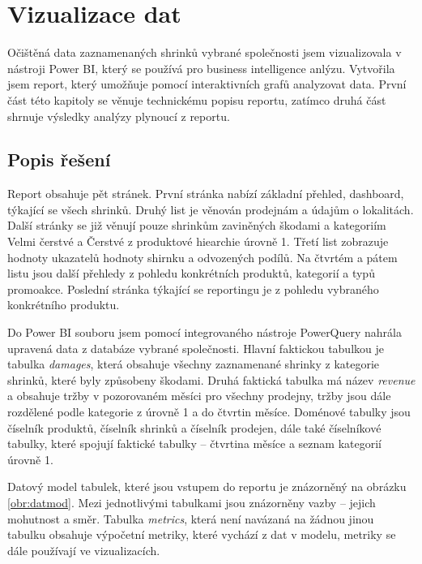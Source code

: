 \chapter{Vizualizace dat}
\label{ch:vizualizace}

Očištěná data zaznamenaných shrinků vybrané společnosti jsem vizualizovala v nástroji Power BI, který se používá pro business intelligence anlýzu. Vytvořila jsem report, který umožňuje pomocí interaktivních grafů analyzovat data. První část této kapitoly se věnuje technickému popisu reportu, zatímco druhá část shrnuje výsledky analýzy plynoucí z reportu.

\section{Popis řešení}
\label{sec:vizualizace:popis}

Report obsahuje pět stránek. První stránka nabízí základní přehled, dashboard, týkající se všech shrinků. Druhý list je věnován prodejnám a údajům o lokalitách.
Další stránky se již věnují pouze shrinkům zaviněných škodami a kategoriím Velmi čerstvé a Čerstvé z produktové hiearchie úrovně 1. Třetí list zobrazuje hodnoty ukazatelů hodnoty shirnku a odvozených podílů. Na čtvrtém a pátem listu jsou další přehledy z pohledu konkrétních produktů, kategorií a typů promoakce. Poslední stránka týkající se reportingu je z pohledu vybraného konkrétního produktu.

Do Power BI souboru jsem pomocí integrovaného nástroje PowerQuery nahrála upravená data z databáze vybrané společnosti. Hlavní faktickou tabulkou je tabulka \emph{damages}, která obsahuje všechny zaznamenané shrinky z kategorie shrinků, které byly způsobeny škodami. Druhá faktická tabulka má název \emph{revenue} a obsahuje tržby v pozorovaném měsíci pro všechny prodejny, tržby jsou dále rozdělené podle kategorie z úrovně 1 a do čtvrtin měsíce. Doménové tabulky jsou číselník produktů, číselník shrinků a číselník prodejen, dále také číselníkové tabulky, které spojují faktické tabulky -- čtvrtina měsíce a seznam kategorií úrovně 1. 

Datový model tabulek, které jsou vstupem do reportu je znázorněný na obrázku \ref{obr:datmod}. Mezi jednotlivými tabulkami jsou znázorněny vazby -- jejich mohutnost a směr. Tabulka \emph{metrics}, která není navázaná na žádnou jinou tabulku obsahuje výpočetní metriky, které vychází z dat v modelu, metriky se dále používají ve vizualizacích.

